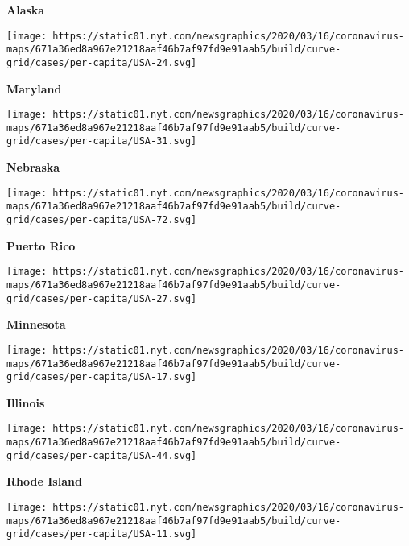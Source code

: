 \textbf{Alaska}

\href{https://www.nytimes.com/interactive/2020/us/maryland-coronavirus-cases.html}{}

\texttt{[image: https://static01.nyt.com/newsgraphics/2020/03/16/coronavirus-maps/671a36ed8a967e21218aaf46b7af97fd9e91aab5/build/curve-grid/cases/per-capita/USA-24.svg]}

\textbf{Maryland}

\href{https://www.nytimes.com/interactive/2020/us/nebraska-coronavirus-cases.html}{}

\texttt{[image: https://static01.nyt.com/newsgraphics/2020/03/16/coronavirus-maps/671a36ed8a967e21218aaf46b7af97fd9e91aab5/build/curve-grid/cases/per-capita/USA-31.svg]}

\textbf{Nebraska}

\href{https://www.nytimes.com/interactive/2020/us/puerto-rico-coronavirus-cases.html}{}

\texttt{[image: https://static01.nyt.com/newsgraphics/2020/03/16/coronavirus-maps/671a36ed8a967e21218aaf46b7af97fd9e91aab5/build/curve-grid/cases/per-capita/USA-72.svg]}

\textbf{Puerto Rico}

\href{https://www.nytimes.com/interactive/2020/us/minnesota-coronavirus-cases.html}{}

\texttt{[image: https://static01.nyt.com/newsgraphics/2020/03/16/coronavirus-maps/671a36ed8a967e21218aaf46b7af97fd9e91aab5/build/curve-grid/cases/per-capita/USA-27.svg]}

\textbf{Minnesota}

\href{https://www.nytimes.com/interactive/2020/us/illinois-coronavirus-cases.html}{}

\texttt{[image: https://static01.nyt.com/newsgraphics/2020/03/16/coronavirus-maps/671a36ed8a967e21218aaf46b7af97fd9e91aab5/build/curve-grid/cases/per-capita/USA-17.svg]}

\textbf{Illinois}

\href{https://www.nytimes.com/interactive/2020/us/rhode-island-coronavirus-cases.html}{}

\texttt{[image: https://static01.nyt.com/newsgraphics/2020/03/16/coronavirus-maps/671a36ed8a967e21218aaf46b7af97fd9e91aab5/build/curve-grid/cases/per-capita/USA-44.svg]}

\textbf{Rhode Island}

\href{https://www.nytimes.com/interactive/2020/us/washington-dc-coronavirus-cases.html}{}

\texttt{[image: https://static01.nyt.com/newsgraphics/2020/03/16/coronavirus-maps/671a36ed8a967e21218aaf46b7af97fd9e91aab5/build/curve-grid/cases/per-capita/USA-11.svg]}

